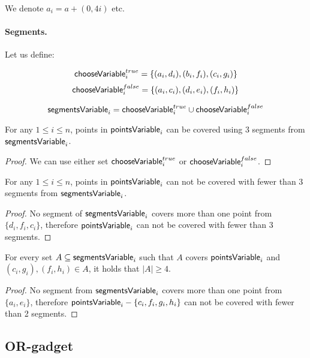 We denote $a_i = a + (0,4i)$ etc.

\paragraph{Segments.}

\newcommand{\xTrueSegment}[1]{(c_{#1}, g_{#1})}
\newcommand{\xFalseSegment}[1]{(f_{#1}, h_{#1})}
\newcommand{\orTrueSegment}[2]{(t_{#1, #2}, v_{#1, #2})}

Let us define:

$$\mathsf{chooseVariable}^{true}_{i} =\{ (a_i, d_i), (b_i, f_i), (c_i, g_i)\}$$
$$\mathsf{chooseVariable}^{false}_{i} = \{(a_i, c_i), (d_i, e_i), (f_i, h_i)\}$$

$$\mathsf{segmentsVariable}_{i} = \mathsf{chooseVariable}^{true}_{i} \cup \mathsf{chooseVariable}^{false}_{i}$$


\begin{lemma}
\label{choose_variables_solution}
For any $1 \le i \le n$, points in $\mathsf{pointsVariable}_{i}$
can be covered using 3 segments from $\mathsf{segmentsVariable}_{i}$.
\end{lemma}

\begin{proof}
We can use either set $\mathsf{chooseVariable}^{true}_{i}$ or $\mathsf{chooseVariable}^{false}_{i}$.
\end{proof}

\begin{lemma}
\label{choose_variables_no_less}
For any $1 \le i \le n$, points in $\mathsf{pointsVariable}_{i}$
can not be covered with fewer than 3 segments from $\mathsf{segmentsVariable}_{i}$.
\end{lemma}

\begin{proof}
No segment of $\mathsf{segmentsVariable}_{i}$ covers more than one point from
$\{d_i, f_i, c_i\}$, therefore $\mathsf{pointsVariable}_{i}$ can
not be covered with fewer than 3 segments.
\end{proof}

\begin{lemma}
\label{choose_variables_both}
For every set $A \subseteq \mathsf{segmentsVariable}_{i}$ such that $A$ covers $\mathsf{pointsVariable}_{i}$
and $\xTrueSegment{i}, \xFalseSegment{i} \in A$,
it holds that $|A| \ge 4$.
\end{lemma}
\begin{proof}
No segment from $\mathsf{segmentsVariable}_{i}$ covers more than one point from
$\{a_i, e_i\}$,
therefore 
$\mathsf{pointsVariable}_{i} - \{c_i, f_i, g_i, h_i\}$
can not be covered with fewer than 2 segments.
\end{proof}


\subsection{OR-gadget}

